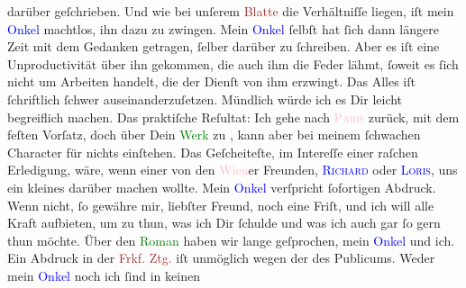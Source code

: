                darüber geſchrieben. Und wie {\pb}bei unſerem \textcolor{brown}{Blatte}{} die Verhältniſſe liegen,
               iſt mein \textcolor{blue}{Onkel}{} machtlos, ihn
               dazu zu zwingen. Mein \textcolor{blue}{Onkel}{}
               ſelbſt hat ſich dann längere Zeit mit dem Gedanken getragen, ſelber darüber zu
               ſchreiben. Aber es iſt eine Unproductivität über ihn gekommen, die auch ihm die Feder
               lähmt, ſoweit es ſich nicht um Arbeiten handelt, die der Dienſt von ihm erzwingt. Das
               Alles iſt {\pb} ſchriftlich ſchwer auseinanderzuſetzen.
               Mündlich würde ich es Dir leicht begreiflich machen. Das praktiſche Reſultat: Ich
               gehe nach \textcolor{pink}{\textsc{Paris}}{}\ledrightnote{\textcolor{pink}{Paris}} zurück, mit dem feſten Vorſatz, doch über Dein \textcolor{green}{Werk}{} zu \label{K_L02709-7v}\label{K_L02709-7h}, kann aber bei meinem ſchwachen Character für nichts einſtehen.
               Das Geſcheiteſte, im Intereſſe einer raſchen Erledigung, wäre, wenn einer von den \textcolor{pink}{Wien}{}\ledrightnote{\textcolor{pink}{Wien}}er Freunden, \textsc{\textcolor{blue}{Richard}{}\ledrightnote{\textcolor{blue}{Richard Beer-Hofmann}}} oder \textsc{\textcolor{blue}{Loris}{}\ledrightnote{\textcolor{blue}{Hugo von Hofmannsthal}}}, uns ein kleines \introOben{}\label{K_L02709-8v}\label{K_L02709-8h}\introOben{}{ }\strikeout{\textcolor{gray}{×}\-\textcolor{gray}{×}\-\textcolor{gray}{×}\-\textcolor{gray}{×}\-\textcolor{gray}{×}\-\textcolor{gray}{×}} darüber machen wollte. Mein \textcolor{blue}{Onkel}{} verſpricht {\pb}ſofortigen Abdruck. Wenn
               nicht, ſo gewähre mir, liebſter Freund, noch eine Friſt, und ich will alle Kraft
               aufbieten, um zu thun, was ich Dir ſchulde und was ich auch gar ſo gern thun
               möchte.\pend
           \pstart
           Über den \textcolor{green}{Roman}{} haben wir lange
               geſprochen, mein \textcolor{blue}{Onkel}{} und
               ich. Ein Abdruck in der \textcolor{brown}{Frkf.
                     Ztg.}{}\ledrightnote{\textcolor{brown}{Frankfurter Zeitung}} iſt unmöglich wegen der \label{K_L02709-4v}\label{K_L02709-4h} des Publicums. Weder mein \textcolor{blue}{Onkel}{} noch ich ſind in keinen
